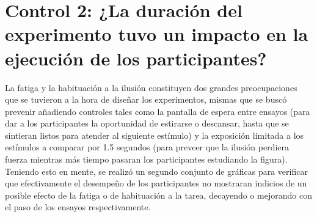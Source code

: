 \begin{itemize}

\end{itemize}








\section{Control 2: ¿La duración del experimento tuvo un impacto en la ejecución de los participantes?}

La fatiga y la habituación a la ilusión constituyen dos grandes preocupaciones que se tuvieron a la hora de diseñar los experimentos, mismas que se buscó prevenir añadiendo controles tales como la pantalla de espera entre ensayos (para dar a los participantes la oportunidad de estirarse o descansar, hasta que se sintieran listos para atender al siguiente estímulo) y la exposición limitada a los estímulos a comparar por 1.5 segundos (para preveer que la ilusión perdiera fuerza mientras más tiempo pasaran los participantes estudiando la figura). Teniendo esto en mente, se realizó un segundo conjunto de gráficas para verificar que efectivamente el desempeño de los participantes no mostraran indicios de un posible efecto de la fatiga  o de habituación a la tarea, decayendo o mejorando con el paso de los ensayos respectivamente.\\ 



